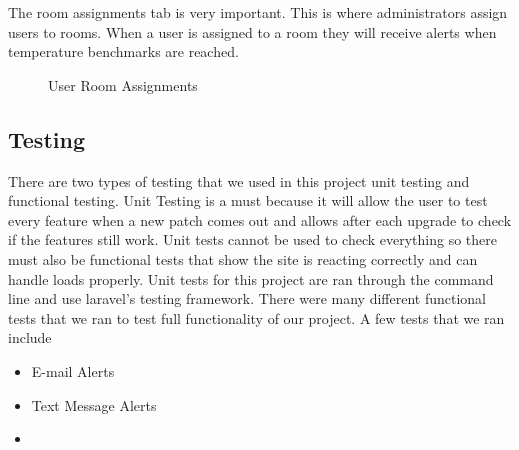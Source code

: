 \documentclass{report}
\begin{document}
\newpage
The room assignments tab is very important. This is where administrators assign users to rooms. When a user is assigned to a room they will receive alerts when temperature benchmarks are reached.
\begin{figure}[H]
	\caption{User Room Assignments}
\end{figure}
\newpage
\subsection*{Testing}
There are two types of testing that we used in this project unit testing and functional testing. Unit Testing is a must because it will allow the user to test every feature when a new patch comes out and allows after each upgrade to check if the features still work. Unit tests cannot be used to check everything so there must also be functional tests that show the site is reacting correctly and can handle loads properly.
\newline
\indent
Unit tests for this project are ran through the command line and use laravel's testing framework. 
\newline
\indent
There were many different functional tests that we ran to test full functionality of our project. A few tests that we ran include
\begin {itemize}
\item E-mail Alerts
\item Text Message Alerts
\item 
\end {itemize}
\end{document}
